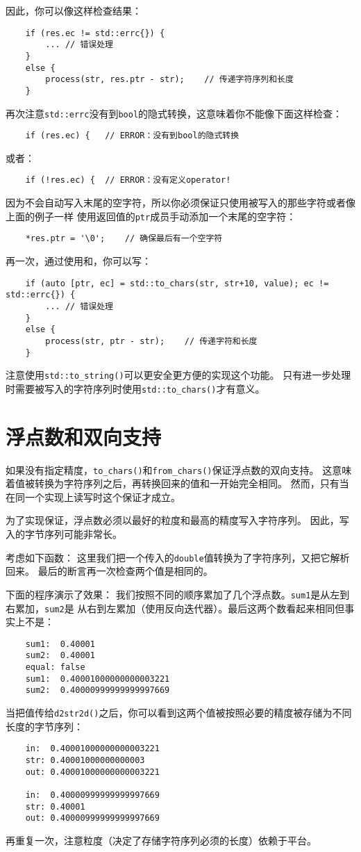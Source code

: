 因此，你可以像这样检查结果：
\begin{lstlisting}
    if (res.ec != std::errc{}) {
        ... // 错误处理
    }
    else {
        process(str, res.ptr - str);    // 传递字符序列和长度
    }
\end{lstlisting}
再次注意\texttt{std::errc}没有到\texttt{bool}的隐式转换，这意味着你不能像下面这样检查：
\begin{lstlisting}
    if (res.ec) {   // ERROR：没有到bool的隐式转换
\end{lstlisting}
或者：
\begin{lstlisting}
    if (!res.ec) {  // ERROR：没有定义operator!
\end{lstlisting}
因为不会自动写入末尾的空字符，所以你必须保证只使用被写入的那些字符或者像上面的例子一样
使用返回值的\texttt{ptr}成员手动添加一个末尾的空字符：
\begin{lstlisting}
    *res.ptr = '\0';    // 确保最后有一个空字符
\end{lstlisting}
再一次，通过使用和，你可以写：
\begin{lstlisting}
    if (auto [ptr, ec] = std::to_chars(str, str+10, value); ec != std::errc{}) {
        ... // 错误处理
    }
    else {
        process(str, ptr - str);    // 传递字符和长度
    }
\end{lstlisting}
注意使用\texttt{std::to\_string()}可以更安全更方便的实现这个功能。
只有进一步处理时需要被写入的字符序列时使用\texttt{std::to\_chars()}才有意义。

\section{浮点数和双向支持}
如果没有指定精度，\texttt{to\_chars()}和\texttt{from\_chars()}保证浮点数的双向支持。
这意味着值被转换为字符序列之后，再转换回来的值和一开始完全相同。
然而，只有当在同一个实现上读写时这个保证才成立。

为了实现保证，浮点数必须以最好的粒度和最高的精度写入字符序列。
因此，写入的字节序列可能非常长。

考虑如下函数：
这里我们把一个传入的\texttt{double}值转换为了字符序列，又把它解析回来。
最后的断言再一次检查两个值是相同的。

下面的程序演示了效果：
我们按照不同的顺序累加了几个浮点数。\texttt{sum1}是从左到右累加，\texttt{sum2}是
从右到左累加（使用反向迭代器）。最后这两个数看起来相同但事实上不是：
\begin{lstlisting}
    sum1:  0.40001
    sum2:  0.40001
    equal: false
    sum1:  0.40001000000000003221
    sum2:  0.40000999999999997669
\end{lstlisting}
当把值传给\texttt{d2str2d()}之后，你可以看到这两个值被按照必要的精度被存储为不同长度的字节序列：
\begin{lstlisting}
    in:  0.40001000000000003221
    str: 0.40001000000000003
    out: 0.40001000000000003221

    in:  0.40000999999999997669
    str: 0.40001
    out: 0.40000999999999997669
\end{lstlisting}
再重复一次，注意粒度（决定了存储字符序列必须的长度）依赖于平台。


